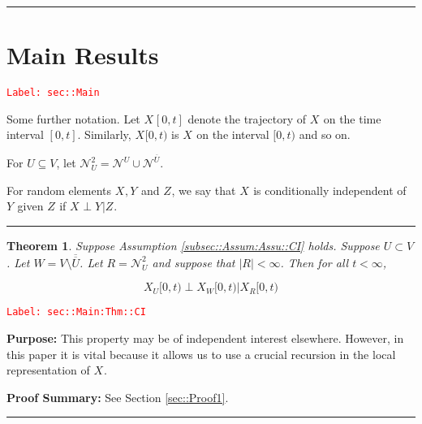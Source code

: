 \documentclass[12pt]{article}
\newcommand{\mc}{\mathcal}
\newcommand{\ov}{\overline}
\newcommand{\tr}{\textcolor{red}}
\newcommand{\labe}[1]{\tr{\texttt{Label: #1}}}
\newcommand{\purpose}{\textbf{Purpose: }}
\newcommand{\pfsum}{\textbf{Proof Summary: }}
\newcommand{\ind}{\hspace{24pt}}
\newcommand{\lin}{\rule{\linewidth}{0.4 pt}}
\renewcommand{\U}{U}							%
\newcommand{\UU}{W}								%
\newcommand{\UUU}{R}							%
\renewcommand{\t}{t}							%
\newcommand{\X}{X}								%
\newcommand{\neigh}{\mc{N}}						%
\newcommand{\dneigh}{\mc{N}^2}					%
\newcommand{\vind}[1]{^{#1}}					%
\newcommand{\cind}[1]{_{#1}}					%
\newcommand{\tip}[1]{#1}						%
\newcommand{\dnvind}[1]{_{#1}}					%
\newcommand{\XX}{Y}								%
\newcommand{\XXX}{Z}							%
\newtheorem{thms}{Theorem}[section]
\begin{document}
\lin
\section{Main Results}
\label{sec::Main}\labe{sec::Main}

Some further notation. Let \(\X\cind{}\tip{[0,\t]}\) denote the trajectory of \(\X\cind{}\tip{}\) on the time interval \([0,\t]\). Similarly, \(\X\cind{}\tip{[0,\t)}\) is \(\X\cind{}\tip{}\) on the interval \([0,\t)\) and so on.

\ind For \(\U \subseteq V\), let \(\dneigh\dnvind{\U} = \neigh\vind{\U} \cup \neigh\vind{\ov{\U}}\). 

\ind For random elements \(\X\cind{}\tip{},\XX\cind{}\tip{}\) and \(\XXX\cind{}\tip{}\), we say that \(\X\cind{}\tip{}\) is conditionally independent of \(\XX\cind{}\tip{}\) given \(\XXX\cind{}\tip{}\) if \(\X\cind{}\tip{}\perp\XX\cind{}\tip{}|\XXX\cind{}\tip{}\).

\lin

\begin{thms}
Suppose Assumption \ref{subsec::Assum:Assu::CI} holds. Suppose \(\U \subset V\). Let \(\UU =V\setminus \ov{\ov{\U}}\). Let \(\UUU= \dneigh\dnvind{U}\) and suppose that \(|\UUU| < \infty\). Then for all \(\t < \infty\),

\[\X\cind{\U}\tip{[0,\t)}\perp \X\cind{\UU}\tip{[0,\t)}|\X\cind{\UUU}\tip{[0,\t)}\]
\label{sec::Main:Thm::CI}
\end{thms}
\labe{sec::Main:Thm::CI}

\purpose This property may be of independent interest elsewhere. However, in this paper it is vital because it allows us to use a crucial recursion in the local representation of \(\X\cind{}\tip{}\).

\pfsum See Section \ref{sec::Proof1}.

\lin
\end{document}
